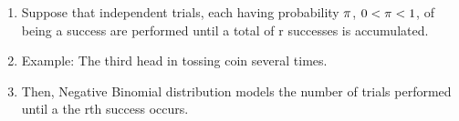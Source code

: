 \documentclass[compress]{beamer}
\newcommand{\sqBullet}[1]{  {\tiny \tiny \tiny \qBoxCol{#1!60}{ }} }
\begin{document}
\begin{frame}
\begin{enumerate}
\item Suppose that independent trials, each having probability  $\pi$,
$0 < \pi < 1$, of being a success are performed until a total of r
successes is accumulated.
\item  Example: The third head in tossing coin several times.

\item  Then, Negative Binomial distribution models the number of trials
performed until a the rth success occurs.
\end{enumerate}




\end{frame}
\end{document}
